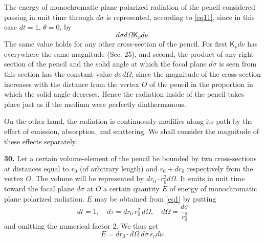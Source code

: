 \documentclass[12pt,oneside]{book}
\begin{document}
The energy of monochromatic plane polarized radiation of the pencil considered passing in unit time through $d\sigma$ is represented, according to \eqref{eq11}, since in this case $dt=1$, $\theta=0$, by 
\begin{equation}
    \label{eq30}
    d\sigma d\Omega \mathsf{K}_\nu d\nu.
\end{equation}
The same value holds for any other cross-section of the pencil. For first $\mathsf{K}_\nu d\nu$ has everywhere the same magnitude (Sec. 25), and second, the product of any right section of the pencil and the solid angle at which the focal plane $d\sigma$ is seen from this section has the constant value $d\sigma d\Omega$, since the magnitude of the cross-section increases with the distance from the vertex $O$ of the pencil in the proportion in which the solid angle decreses. Hence the radiation inside of the pencil takes place just as if the medium were perfectly diathermanous. \par 

On the other hand, the radiation is continuously modifies along its path by the effect of emission, absorption, and scattering. We shall consider the magnitude of these effects separately. \par 

\textbf{30.} Let a certain volume-element of the pencil be bounded by two cross-sections at distances equal to $r_0$ (of arbitrary length) and $r_0+dr_0$ respectively from the vertex $O$. The volume will be represented by $dr_0\cdot r_0^2d\Omega$. It emits in unit time toward the focal plane $d\sigma$ at $O$ a certain quantity $E$ of energy of monochromatic plane polarized radiation. $E$ may be obtained from \eqref{eq1} by putting 
\begin{equation*}
    dt=1,\quad d\tau=d r_0\, r_0^2\, d\Omega,\quad d\Omega=\frac{d\sigma}{r_0^2}
\end{equation*}
and omitting the numerical factor 2. We thus get 
\begin{equation}
    E=dr_0\cdot d\Omega\ d\sigma\ \epsilon_\nu d\nu. 
    \label{eq31}
\end{equation} \par 
\end{document}
